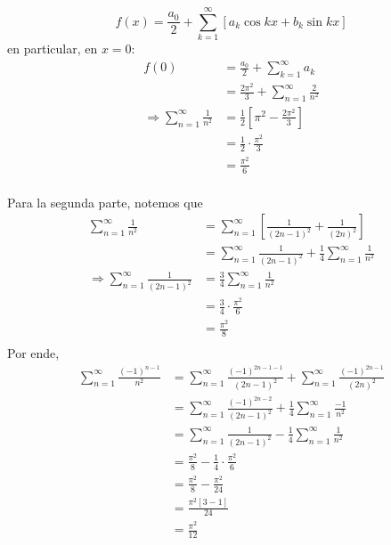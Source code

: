 \documentclass[12pt]{report}
\theoremstyle{largebreak}
\begin{document}
\begin{sol}
        \begin{equation*}
            f(x)=\frac{a_0}{2}+\sum_{ k=1}^\infty\left[a_k\cos kx+b_k\sin kx \right]
        \end{equation*}
        en particular, en $x=0$:
        \begin{equation*}
            \begin{split}
                f(0)&=\frac{a_0}{2}+\sum_{ k=1}^\infty a_k\\
                &=\frac{2\pi^2}{3}+\sum_{ n=1}^\infty\frac{2}{n^2}\\
                \Rightarrow \sum_{ n=1}^\infty\frac{1}{n^2}&=\frac{1}{2}\left[\pi^2-\frac{2\pi^2}{3}\right] \\
                &=\frac{1}{2}\cdot\frac{\pi^2}{3}\\
                &=\frac{\pi^2}{6}\\
            \end{split}
        \end{equation*}
        
        Para la segunda parte, notemos que
        \begin{equation*}
            \begin{split}
                \sum_{ n=1}^\infty\frac{1}{n^2}&=\sum_{ n=1}^\infty\left[\frac{1}{(2n-1)^2}+\frac{1}{(2n)^2} \right]\\
                &=\sum_{ n=1}^\infty\frac{1}{(2n-1)^2}+\frac{1}{4}\sum_{ n=1}^\infty\frac{1}{n^2}\\
                \Rightarrow \sum_{ n=1}^\infty\frac{1}{(2n-1)^2}&=\frac{3}{4}\sum_{ n=1}^\infty\frac{1}{n^2}\\
                &=\frac{3}{4}\cdot\frac{\pi^2}{6}\\
                &=\frac{\pi^2}{8}\\
            \end{split}
        \end{equation*}
        Por ende,
        \begin{equation*}
            \begin{split}
                \sum_{ n=1}^\infty\frac{(-1)^{ n-1}}{n^2}&=\sum_{ n=1}^\infty\frac{(-1)^{ 2n-1-1}}{(2n-1)^2}+\sum_{ n=1}^\infty\frac{(-1)^{ 2n-1}}{(2n)^2}\\
                &=\sum_{ n=1}^\infty\frac{(-1)^{ 2n-2}}{(2n-1)^2}+\frac{1}{4}\sum_{ n=1}^\infty\frac{-1}{n^2}\\
                &=\sum_{ n=1}^\infty\frac{1}{(2n-1)^2}-\frac{1}{4}\sum_{ n=1}^\infty\frac{1}{n^2}\\
                &=\frac{\pi^2}{8}-\frac{1}{4}\cdot\frac{\pi^2}{6}\\
                &=\frac{\pi^2}{8}-\frac{\pi^2}{24}\\
                &=\frac{\pi^2\left[3-1\right]}{24}\\
                &=\frac{\pi^2}{12}\\
            \end{split}
        \end{equation*}
    \end{sol}
\end{document}
